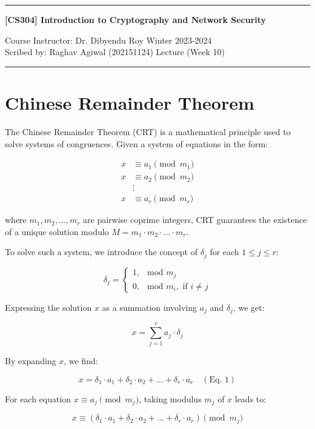 \documentclass[11pt]{article}
\begin{document}
\noindent
\rule{\textwidth}{1pt}
\begin{center}
{\bf [CS304] Introduction to Cryptography and Network Security}
\end{center}
Course Instructor: Dr. Dibyendu Roy \hfill Winter 2023-2024\\
Scribed by: Raghav Agiwal (202151124) \hfill Lecture (Week 10)
\\
\rule{\textwidth}{1pt}


\section{Chinese Remainder Theorem}

The Chinese Remainder Theorem (CRT) is a mathematical principle used to solve systems of congruences. Given a system of equations in the form:

\[
\begin{aligned}
x &\equiv a_1 \pmod{m_1} \\
x &\equiv a_2 \pmod{m_2} \\
&\vdots \\
x &\equiv a_r \pmod{m_r}
\end{aligned}
\]

where $m_1, m_2, \ldots, m_r$ are pairwise coprime integers, CRT guarantees the existence of a unique solution modulo $M = m_1 \cdot m_2 \cdot \ldots \cdot m_r$.

To solve such a system, we introduce the concept of $\delta_j$ for each $1 \leq j \leq r$:

\[
\delta_j =
\begin{cases}
1, & \text{mod } m_j \\
0, & \text{mod } m_i, \text{ if } i \neq j
\end{cases}
\]

Expressing the solution $x$ as a summation involving $a_j$ and $\delta_j$, we get:

\[
x = \sum_{j=1}^{r} a_j \cdot \delta_j
\]

By expanding $x$, we find:

\[
x = \delta_1 \cdot a_1 + \delta_2 \cdot a_2 + \ldots + \delta_r \cdot a_r \quad (\text{Eq. 1})
\]

For each equation $x \equiv a_j \pmod{m_j}$, taking modulus $m_j$ of $x$ leads to:

\[
x \equiv (\delta_1 \cdot a_1 + \delta_2 \cdot a_2 + \ldots + \delta_r \cdot a_r) \pmod{m_j}
\]
\end{document}
